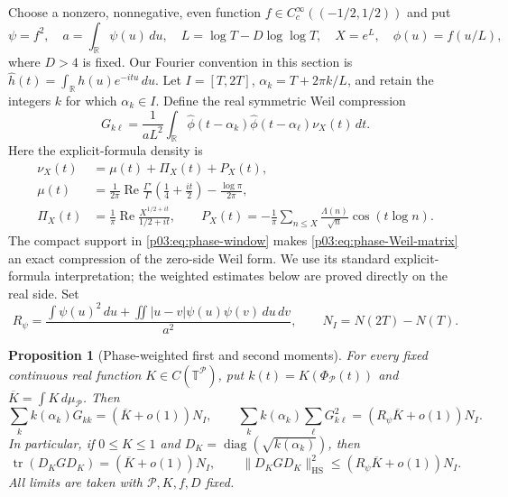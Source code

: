 \documentclass[11pt,letterpaper]{article}
\newtheorem{proposition}[theorem]{Proposition}
\theoremstyle{definition}
\theoremstyle{remark}
\newcommand{\R}{\mathbb R}
\renewcommand{\Re}{\operatorname{Re}}
\newcommand{\1}{\mathbf 1}
\begin{document}
Choose a nonzero, nonnegative, even function
$f\in C_c^\infty((-1/2,1/2))$ and put
\begin{equation}\label{p03:eq:phase-window}
 \psi=f^2,\quad a=\int_{\R}\psi(u)\,du,\quad
 L=\log T-D\log\log T,\quad X=e^L,\quad \phi(u)=f(u/L),
\end{equation}
where $D>4$ is fixed. Our Fourier convention in this section is
$\widehat h(t)=\int_{\R}h(u)e^{-itu}\,du$. Let
$I=[T,2T]$, $\alpha_k=T+2\pi k/L$, and retain the integers $k$ for
which $\alpha_k\in I$. Define the real symmetric Weil compression
\begin{equation}\label{p03:eq:phase-Weil-matrix}
 G_{k\ell}=\frac1{aL^2}\int_{\R}
 \widehat\phi(t-\alpha_k)\widehat\phi(t-\alpha_\ell)
 \nu_X(t)\,dt.
\end{equation}
Here the explicit-formula density is
\begin{align*}
 \nu_X(t)&=\mu(t)+\Pi_X(t)+P_X(t),\\
 \mu(t)&=\frac1{2\pi}\Re\frac{\Gamma'}{\Gamma}
                  \left(\frac14+\frac{it}2\right)
                 -\frac{\log\pi}{2\pi},\\
 \Pi_X(t)&=\frac1\pi\Re\frac{X^{1/2+it}}{1/2+it},\qquad
 P_X(t)=-\frac1\pi\sum_{n\le X}\frac{\Lambda(n)}{\sqrt n}
                                      \cos(t\log n).
\end{align*}
The compact support in \eqref{p03:eq:phase-window} makes
\eqref{p03:eq:phase-Weil-matrix} an exact compression of the zero-side
Weil form. We use its standard explicit-formula interpretation; the
weighted estimates below are proved directly on the real side.
Set
\begin{equation}\label{p03:eq:phase-R}
 R_\psi=\frac{\displaystyle\int\psi(u)^2\,du+
       \displaystyle\iint|u-v|\psi(u)\psi(v)\,du\,dv}{a^2},
 \qquad N_I=N(2T)-N(T).
\end{equation}

\begin{proposition}[Phase-weighted first and second moments]
\label{p03:prop:phase-moments}
For every fixed continuous real function
$K\in C(\mathbb T^{\mathcal P})$, put
$k(t)=K(\Phi_{\mathcal P}(t))$ and
$\overline K=\int K\,d\mu_{\mathcal P}$. Then
\begin{equation}\label{p03:eq:phase-moments}
 \sum_k k(\alpha_k)G_{kk}=(\overline K+o(1))N_I,
 \qquad
 \sum_k k(\alpha_k)\sum_\ell G_{k\ell}^2
       =(R_\psi\overline K+o(1))N_I.
\end{equation}
In particular, if $0\le K\le1$ and
$D_K=\operatorname{diag}(\sqrt{k(\alpha_k)})$, then
\begin{equation}\label{p03:eq:phase-compressed-moments}
 \operatorname{tr}(D_KGD_K)=(\overline K+o(1))N_I,
 \qquad
 \|D_KGD_K\|_{\mathrm{HS}}^2
       \le(R_\psi\overline K+o(1))N_I.
\end{equation}
All limits are taken with $\mathcal P,K,f,D$ fixed.
\end{proposition}
\end{document}
